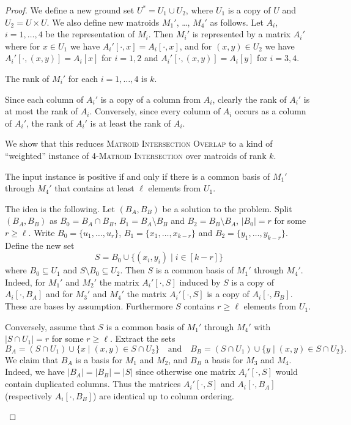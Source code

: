 \documentclass{theoretics}
\begin{document}
\begin{proof}
  We define a new ground set $U^*=U_1 \cup U_2$, where
  $U_1$ is a copy of $U$ and $U_2=U \times U$.
  We also define new matroids $M_1'$, \ldots, $M_4'$ as follows.
  Let $A_i$, $i=1, \ldots, 4$ be the representation of $M_i$.
  Then $M_i'$ is represented by a matrix $A_i'$ where
  for $x \in U_1$ we have $A_i'[\cdot,x]=A_i[\cdot,x]$,
  and for $(x,y) \in U_2$ we have
  $A_i'[\cdot,(x,y)]=A_i[x]$ for $i=1, 2$ and
  $A_i'[\cdot,(x,y)]=A_i[y]$ for $i=3,4$.
  
  \begin{claim}
    The rank of $M_i'$ for each $i=1, \ldots, 4$ is $k$.
  \end{claim}
  \begin{subproof}
    Since each column of $A_i'$ is a copy of a column from $A_i$,
    clearly the rank of $A_i'$ is at most the rank of $A_i$.
    Conversely, since every column of $A_i$ occurs as a column of $A_i'$,
    the rank of $A_i'$ is at least the rank of $A_i$. 
  \end{subproof}
  
  We show that this reduces \textsc{Matroid Intersection Overlap}
  to a kind of ``weighted'' instance of \textsc{4-Matroid Intersection}
  over matroids of rank $k$.
  
  \begin{claim}
    The input instance is positive if and only if there is a common
    basis of $M_1'$ through $M_4'$ that contains at least $\ell$
    elements from $U_1$. 
  \end{claim}
  \begin{subproof}
    The idea is the following. Let $(B_A, B_B)$ be a solution to the problem.
    Split $(B_A, B_B)$ as $B_0=B_A \cap B_B$, $B_1 = B_A \setminus B_B$
    and $B_2=B_B \setminus B_A$, $|B_0|=r$ for some $r \geq \ell$.
    Write $B_0=\{u_1,\ldots,u_r\}$, 
    $B_1=\{x_1,\ldots,x_{k-r}\}$ and $B_2=\{y_1,\ldots,y_{k-r}\}$.
    Define the new set
    \[
      S=B_0 \cup \{(x_i,y_i) \mid i \in [k-r]\}
    \]
    where $B_0 \subseteq U_1$ and $S \setminus B_0 \subseteq U_2$. 
    Then $S$ is a common basis of $M_1'$ through $M_4'$. 
    Indeed, for $M_1'$ and $M_2'$ the matrix
    $A_i'[\cdot,S]$ induced by $S$ is a copy of $A_i[\cdot,B_A]$
    and for $M_3'$ and $M_4'$ the matrix
    $A_i'[\cdot,S]$ is a copy of $A_i[\cdot,B_B]$.
    These are bases by assumption. Furthermore $S$ contains
    $r \geq \ell$ elements from $U_1$.

    Conversely, assume that $S$ is a common basis of $M_1'$ through
    $M_4'$ with $|S \cap U_1|=r$ for some $r \geq \ell$.
    Extract the sets
    \[
      B_A = (S \cap U_1) \cup \{x \mid (x,y) \in S \cap U_2\}
      \quad \text{and} \quad
      B_B = (S \cap U_1) \cup \{y \mid (x,y) \in S \cap U_2\}.
    \]
    We claim that $B_A$ is a basis for $M_1$ and $M_2$,
    and $B_B$ a basis for $M_3$ and $M_4$. Indeed, we have
    $|B_A|=|B_B|=|S|$ since otherwise one matrix $A_i'[\cdot,S]$
    would contain duplicated columns. 
    Thus the matrices $A_i'[\cdot,S]$
    and $A_i[\cdot,B_A]$ (respectively $A_i[\cdot,B_B]$)
    are identical up to column ordering.
  \end{subproof}
  

\end{proof}
\end{document}
